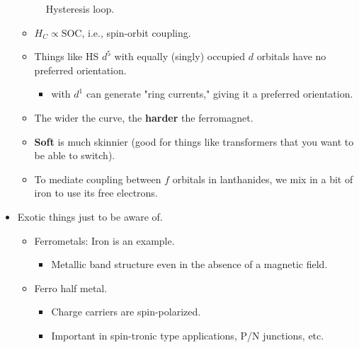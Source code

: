\documentclass[../notes.tex]{subfiles}
\begin{document}
\begin{itemize}
\begin{figure}[h!]
        \caption{Hysteresis loop.}
        \label{fig:hysteresis}
    \end{figure}
    \begin{itemize}
        \item $H_C\propto\text{SOC}$, i.e., spin-orbit coupling.
        \item Things like  HS $d^5$ with equally (singly) occupied $d$ orbitals have no preferred orientation.
        \begin{itemize}
            \item {} with $d^1$ can generate "ring currents," giving it a preferred orientation.
        \end{itemize}
        \item The wider the curve, the \textbf{harder} the ferromagnet.
        \item \textbf{Soft} is much skinnier (good for things like transformers that you want to be able to switch).
        \item To mediate coupling between $f$ orbitals in lanthanides, we mix in a bit of iron to use its free electrons.
    \end{itemize}
    \item Exotic things just to be aware of.
    \begin{itemize}
        \item Ferrometals: Iron is an example.
        \begin{itemize}
            \item Metallic band structure even in the absence of a magnetic field.
        \end{itemize}
        \item Ferro half metal.
        \begin{itemize}
            \item Charge carriers are spin-polarized.
            \item Important in spin-tronic type applications, P/N junctions, etc.

\end{itemize}
\end{itemize}
\end{itemize}
\end{document}
